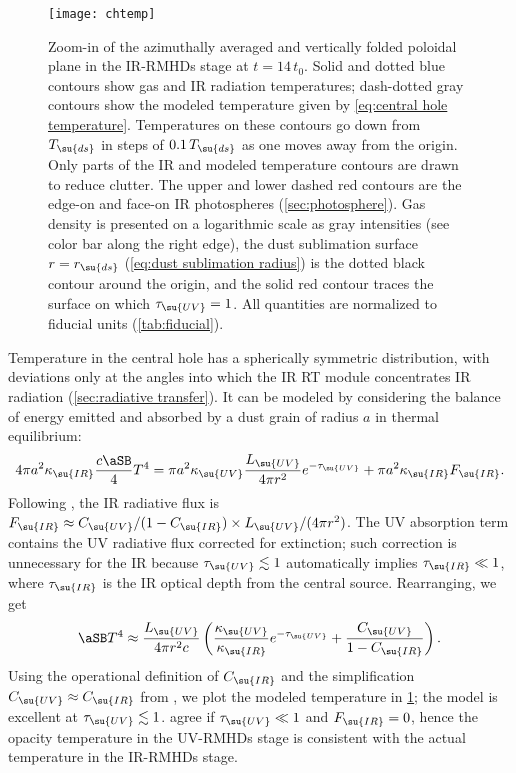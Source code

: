 \documentclass[twocolumn]{article}
\newcommand*\uvrmhd{\ac{UV}\protect\nobreakdash-\acp{RMHD}}
\newcommand*\irrmhd{\ac{IR}\protect\nobreakdash-\acp{RMHD}}
\begin{document}
\begin{figure}
\texttt{[image: chtemp]}
\caption{Zoom-in of the azimuthally averaged and vertically folded poloidal
plane in the \irrmhd{} stage at $t=14\,t_0$. Solid and dotted blue contours
show gas and \ac{IR} radiation temperatures; dash-dotted gray contours show the
modeled temperature given by \cref{eq:central hole temperature}. Temperatures
on these contours go down from $T_\su{ds}$ in steps of $0.1\,T_\su{ds}$ as one
moves away from the origin. Only parts of the \ac{IR} and modeled temperature
contours are drawn to reduce clutter. The upper and lower dashed red contours
are the edge-on and face-on \ac{IR} photospheres (\cref{sec:photosphere}). Gas
density is presented on a logarithmic scale as gray intensities (see color bar
along the right edge), the dust sublimation surface $r=r_\su{ds}$
(\cref{eq:dust sublimation radius}) is the dotted black contour around the
origin, and the solid red contour traces the surface on which $\tau_\su{UV}=1$.
All quantities are normalized to fiducial units (\cref{tab:fiducial}).}
\label{fig:temperature}
\end{figure}

Temperature in the central hole has a spherically symmetric distribution, with
deviations only at the angles into which the \ac{IR} \ac{RT} module
concentrates \ac{IR} radiation (\cref{sec:radiative transfer}). It can be
modeled by considering the balance of energy emitted and absorbed by a dust
grain of radius $a$ in thermal equilibrium:
\begin{equation}
4\pi a^2\kappa_\su{IR}\frac{c\aSB}4T^4=
  \pi a^2\kappa_\su{UV}\frac{L_\su{UV}}{4\pi r^2}e^{-\tau_\su{UV}}+
  \pi a^2\kappa_\su{IR}F_\su{IR}.
\end{equation}
Following , the \ac{IR} radiative flux is
$F_\su{IR}\approx C_\su{UV}/(1-C_\su{IR})\times L_\su{UV}/(4\pi r^2)$. The
\ac{UV} absorption term contains the \ac{UV} radiative flux corrected for
extinction; such correction is unnecessary for the \ac{IR} because
$\tau_\su{UV}\lesssim1$ automatically implies $\tau_\su{IR}\ll1$, where
$\tau_\su{IR}$ is the \ac{IR} optical depth from the central source.
Rearranging, we get
\begin{equation}\label{eq:central hole temperature}
\aSB T^4\approx\frac{L_\su{UV}}{4\pi r^2c}
  \left(\frac{\kappa_\su{UV}}{\kappa_\su{IR}}e^{-\tau_\su{UV}}
  +\frac{C_\su{UV}}{1-C_\su{IR}}\right).
\end{equation}
Using the operational definition of $C_\su{IR}$ and the simplification
$C_\su{UV}\approx C_\su{IR}$ from , we plot the
modeled temperature in \cref{fig:temperature}; the model is excellent at
$\tau_\su{UV}\lesssim1$.  agree if $\tau_\su{UV}\ll1$ and $F_\su{IR}=0$, hence the opacity
temperature in the \uvrmhd{} stage is consistent with the actual temperature in
the \irrmhd{} stage.
\end{document}

